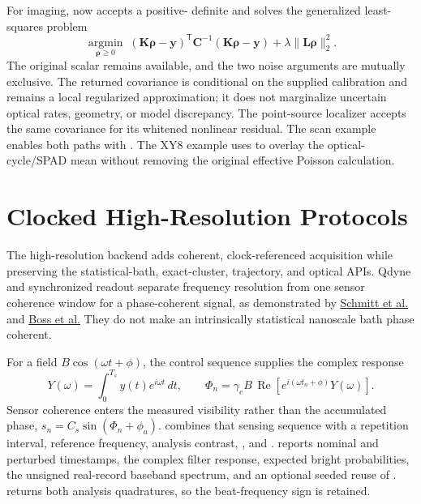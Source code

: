 For imaging,  now accepts a positive-
definite  and solves the generalized least-squares
problem
\[
 \underset{\boldsymbol{\rho}\ge0}{\operatorname{argmin}}\;
 (\mathbf K\boldsymbol{\rho}-\mathbf y)^{\mathsf T}
 \mathbf C^{-1}
 (\mathbf K\boldsymbol{\rho}-\mathbf y)
 +\lambda\lVert\mathbf L\boldsymbol{\rho}\rVert_2^2 .
\]
The original scalar  remains available, and the two noise
arguments are mutually exclusive. The returned covariance is conditional on
the supplied calibration and remains a local regularized approximation; it
does not marginalize uncertain optical rates, geometry, or model discrepancy.
The point-source localizer accepts the same covariance for its whitened
nonlinear residual. The scan example enables both paths with
. The XY8 example uses  to
overlay the optical-cycle/SPAD mean without removing the original effective
Poisson calculation.

\section{Clocked High-Resolution Protocols}

The high-resolution backend adds coherent, clock-referenced acquisition while preserving the
statistical-bath, exact-cluster, trajectory, and optical APIs. Qdyne and
synchronized readout separate frequency resolution from one sensor
coherence window for a phase-coherent signal, as demonstrated by
\href{https://doi.org/10.1126/science.aam5532}{Schmitt et al.} and
\href{https://doi.org/10.1126/science.aam7009}{Boss et al.}
They do not make an intrinsically statistical nanoscale bath phase coherent.

For a field \(B\cos(\omega t+\phi)\), the control sequence supplies
the complex response
\[
 Y(\omega)=\int_0^{T_s}y(t)e^{i\omega t}\,dt ,
\qquad
 \Phi_n=\gamma_eB\,\operatorname{Re}
 \left[e^{i(\omega t_n+\phi)}Y(\omega)\right].
\]
Sensor coherence enters the measured visibility rather than the accumulated phase, \(s_n=C_s\sin(\Phi_n+\phi_a)\).  combines that sensing sequence with a repetition interval, reference frequency, analysis contrast, , and .  reports nominal and
perturbed timestamps, the complex filter response, expected bright
probabilities, the unsigned real-record baseband spectrum, and an optional
seeded reuse of .
 returns both analysis quadratures, so
the beat-frequency sign is retained.

